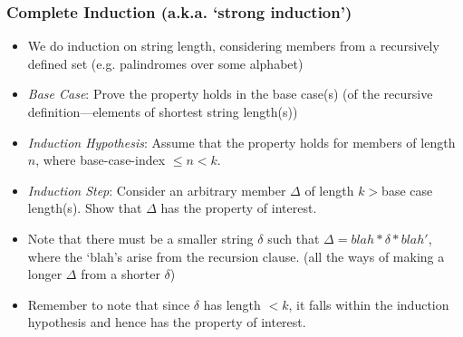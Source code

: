 \begin{frame}
\frametitle{Complete Induction (a.k.a. `strong induction')}

\begin{itemize}[<+->]

\item We do induction on string length, considering members from a recursively defined set (e.g. palindromes over some alphabet)

\item[] \emph{Base Case}: Prove the property holds in the base case(s) (of the recursive definition---elements of shortest string length(s))

\item[] \emph{Induction Hypothesis}: Assume that the property holds for members of length $n$, where base-case-index $ \leq n < k$. 

\item[] \emph{Induction Step}: Consider an arbitrary member $\Delta$ of length $k > $base case length(s). Show that $\Delta$ has the property of interest. 

\item Note that there must be a smaller string $\delta$ such that $\Delta = blah * \delta * blah'$, where the `blah's arise from the recursion clause. (all the ways of making a longer $\Delta$ from a shorter $\delta$)

\item Remember to note that since $\delta$ has length $<k$, it falls within the induction hypothesis and hence has the property of interest. 

\end{itemize}
\end{frame}

